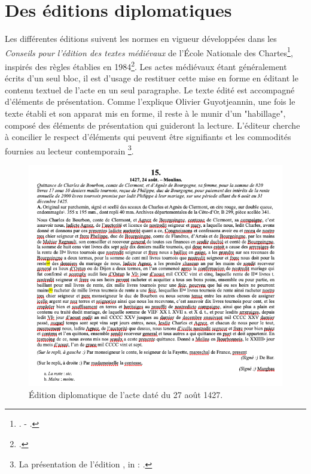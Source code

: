 \section{Des éditions diplomatiques}
\label{I.2.2}

\par Les différentes éditions suivent les normes en vigueur développées dans les \textit{Conseils pour l'édition des textes médiévaux} de l'École Nationale des Chartes\footnote{\cite{guyotjeanninConseilsPourEdition2014}. - \cite{guyotjeanninConseilsPourEdition2009}.}, inspirés des règles établies en 1984\footnote{\cite{c.i.d.NormesInternationalesPour1984}.}. Les actes médiévaux étant généralement écrits d'un seul bloc, il est d'usage de restituer cette mise en forme en éditant le contenu textuel de l'acte en un seul paragraphe. Le texte édité est accompagné d'éléments de présentation. Comme l'explique Olivier Guyotjeannin, \og une fois le texte établi et son apparat mis en forme, il reste à le munir d'un "habillage", composé des éléments de présentation qui guideront la lecture. L'éditeur cherche à concilier le respect d'éléments qui peuvent être signifiants et les commodités fournies au lecteur contemporain \fg \footnote{\og La présentation de l'édition \fg, in : \cite{guyotjeanninConseilsPourEdition2009}.}. 
\newline 

\begin{figure}[ht]
\centering
\includegraphics[scale =0.6]{img/edition.png}
\caption{Édition diplomatique de l'acte daté du 27 août 1427.}
\label{fig:ed_diplo}
\end{figure}

